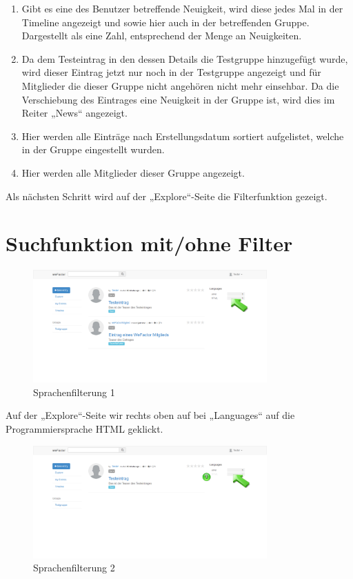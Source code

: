 \begin{enumerate}
\item Gibt es eine des Benutzer betreffende Neuigkeit, wird diese jedes Mal in der Timeline angezeigt und sowie hier auch in der betreffenden Gruppe. Dargestellt als eine Zahl, entsprechend der Menge an Neuigkeiten.
\item Da dem Testeintrag in den dessen Details die Testgruppe hinzugefügt wurde, wird dieser Eintrag jetzt nur noch in der Testgruppe angezeigt und für Mitglieder die dieser Gruppe nicht angehören nicht mehr einsehbar. Da die Verschiebung des Eintrages eine Neuigkeit in der Gruppe ist, wird dies im Reiter „News“ angezeigt.
\item Hier werden alle Einträge nach Erstellungsdatum sortiert aufgelistet, welche in der Gruppe eingestellt wurden.
\item Hier werden alle Mitglieder dieser Gruppe angezeigt.
\end{enumerate}


Als nächsten Schritt wird auf der „Explore“-Seite die Filterfunktion gezeigt.



\chapter{Suchfunktion mit/ohne Filter}

\begin{figure}[H]
    \centering
    \includegraphics[width=0.8\textwidth]{Bilder/26.png}
    \caption{Sprachenfilterung 1}
    \label{fig:sprachenfilterung1}
\end{figure}


Auf der „Explore“-Seite wir rechts oben auf bei „Languages“ auf die Programmiersprache HTML geklickt.

\begin{figure}[H]
    \centering
    \includegraphics[width=0.8\textwidth]{Bilder/27.png}
    \caption{Sprachenfilterung 2}
    \label{fig:sprachenfilterung2}
\end{figure}



